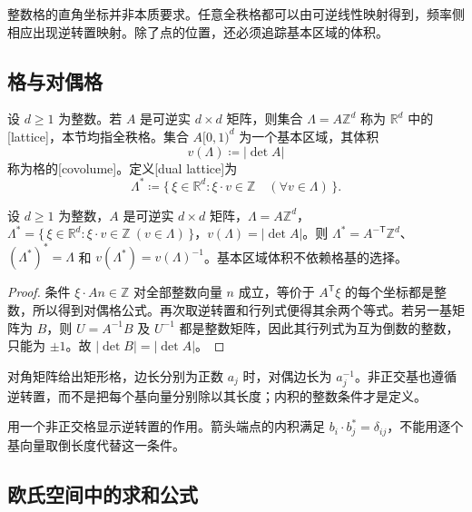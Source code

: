 
整数格的直角坐标并非本质要求。任意全秩格都可以由可逆线性映射得到，频率侧相应出现逆转置映射。除了点的位置，还必须追踪基本区域的体积。

\subsection{格与对偶格}
\label{b2:subsec:060401}

\begin{definition}\label{b2:def:06-lattice}
设 \(d\geq1\) 为整数。若 \(A\) 是可逆实 \(d\times d\) 矩阵，则集合 \(\Lambda=A\mathbb Z^d\) 称为 \(\mathbb R^d\) 中的[lattice]，本节均指全秩格。集合 \(A[0,1)^d\) 为一个基本区域，其体积
\[
 v(\Lambda)\coloneqq|\det A|
\]
称为格的[covolume]。定义[dual lattice]为
\[
 \Lambda^*\coloneqq\{\,\xi\in\mathbb R^d:\xi\cdot v\in\mathbb Z\quad(\forall v\in\Lambda)\,\}.
\]
\end{definition}

\begin{proposition}\label{b2:prop:06-dual-lattice}
设 \(d\geq1\) 为整数，\(A\) 是可逆实 \(d\times d\) 矩阵，\(\Lambda=A\mathbb Z^d\)，\(\Lambda^*=\{\,\xi\in\mathbb R^d:\xi\cdot v\in\mathbb Z\ (v\in\Lambda)\,\}\)，\(v(\Lambda)=|\det A|\)。则 \(\Lambda^*=A^{-\mathsf T}\mathbb Z^d\)、\((\Lambda^*)^*=\Lambda\) 和 \(v(\Lambda^*)=v(\Lambda)^{-1}\)。基本区域体积不依赖格基的选择。
\end{proposition}
\begin{proof}
条件 \(\xi\cdot An\in\mathbb Z\) 对全部整数向量 \(n\) 成立，等价于 \(A^{\mathsf T}\xi\) 的每个坐标都是整数，所以得到对偶格公式。再次取逆转置和行列式便得其余两个等式。若另一基矩阵为 \(B\)，则 \(U=A^{-1}B\) 及 \(U^{-1}\) 都是整数矩阵，因此其行列式为互为倒数的整数，只能为 \(\pm1\)。故 \(|\det B|=|\det A|\)。
\end{proof}

对角矩阵给出矩形格，边长分别为正数 \(a_j\) 时，对偶边长为 \(a_j^{-1}\)。非正交基也遵循逆转置，而不是把每个基向量分别除以其长度；内积的整数条件才是定义。

用一个非正交格显示逆转置的作用。箭头端点的内积满足 \(b_i\cdot b_j^*=\delta_{ij}\)，不能用逐个基向量取倒长度代替这一条件。


\subsection{欧氏空间中的求和公式}
\label{b2:subsec:060402}

